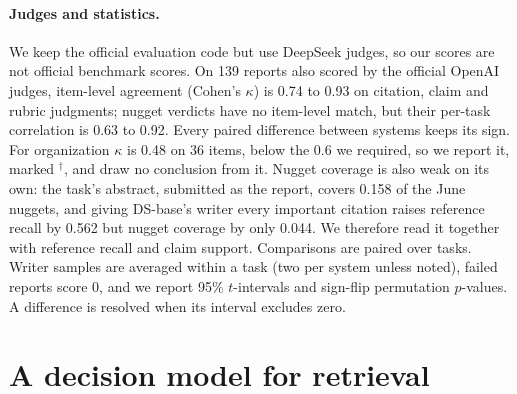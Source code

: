 \documentclass[11pt, letterpaper]{article}
\begin{document}
\paragraph{Judges and statistics.} We keep the official evaluation code but use DeepSeek judges, so
our scores are not official benchmark scores. On 139 reports also scored by the official OpenAI
judges, item-level agreement (Cohen's $\kappa$) is 0.74 to 0.93 on citation, claim and rubric
judgments; nugget verdicts have no item-level match, but their per-task correlation is 0.63 to 0.92.
Every paired difference between systems keeps its sign. For organization $\kappa$ is 0.48 on 36
items, below the 0.6 we required, so we report it, marked $^\dagger$, and draw no conclusion from
it. Nugget coverage is also weak on its own: the task's abstract, submitted as the report, covers
0.158 of the June nuggets, and giving DS-base's writer every important citation raises reference
recall by 0.562 but nugget coverage by only 0.044. We therefore read it together with reference
recall and claim support. Comparisons are paired over tasks. Writer samples are averaged within a
task (two per system unless noted), failed reports score 0, and we report 95\% $t$-intervals and
sign-flip permutation $p$-values. A difference is resolved when its interval excludes zero.

\section{A decision model for retrieval}
\label{sec:controller}
\end{document}
